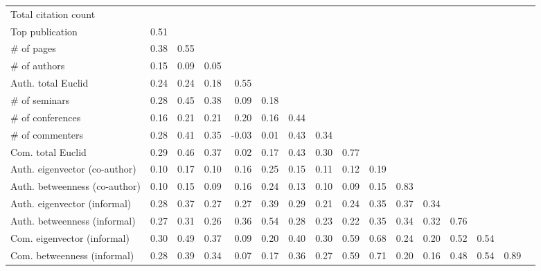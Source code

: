 \begin{tabular}{l|rrrrrrrrrrrrrrr}
\toprule
Total citation count&&&&&&&&&&&&&&&\tabularnewline
Top publication&0.51&&&&&&&&&&&&&&\tabularnewline
\# of pages&0.38&0.55&&&&&&&&&&&&&\tabularnewline
\# of authors&0.15&0.09&0.05&&&&&&&&&&&&\tabularnewline
Auth. total Euclid&0.24&0.24&0.18& 0.55&&&&&&&&&&&\tabularnewline
\# of seminars&0.28&0.45&0.38& 0.09&0.18&&&&&&&&&&\tabularnewline
\# of conferences&0.16&0.21&0.21& 0.20&0.16&0.44&&&&&&&&&\tabularnewline
\# of commenters&0.28&0.41&0.35&-0.03&0.01&0.43&0.34&&&&&&&&\tabularnewline
Com. total Euclid&0.29&0.46&0.37& 0.02&0.17&0.43&0.30&0.77&&&&&&&\tabularnewline
Auth. eigenvector (co-author)&0.10&0.17&0.10& 0.16&0.25&0.15&0.11&0.12&0.19&&&&&&\tabularnewline
Auth. betweenness (co-author)&0.10&0.15&0.09& 0.16&0.24&0.13&0.10&0.09&0.15&0.83&&&&&\tabularnewline
Auth. eigenvector (informal)&0.28&0.37&0.27& 0.27&0.39&0.29&0.21&0.24&0.35&0.37&0.34&&&&\tabularnewline
Auth. betweenness (informal)&0.27&0.31&0.26& 0.36&0.54&0.28&0.23&0.22&0.35&0.34&0.32&0.76&&&\tabularnewline
Com. eigenvector (informal)&0.30&0.49&0.37& 0.09&0.20&0.40&0.30&0.59&0.68&0.24&0.20&0.52&0.54&&\tabularnewline
Com. betweenness (informal)&0.28&0.39&0.34& 0.07&0.17&0.36&0.27&0.59&0.71&0.20&0.16&0.48&0.54&0.89&\tabularnewline
\bottomrule
\end{tabular}
